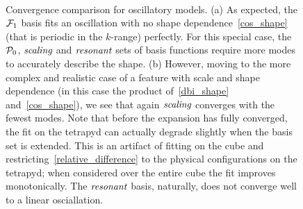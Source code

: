 \begin{figure}[!pth]
\centering     %
\\
\caption{
    Convergence comparison for oscillatory models. (a) As expected, the $\mathcal{F}_1$ basis fits an oscillation with
    no shape dependence~\eqref{cos_shape} (that is periodic in the $k$-range) perfectly.
    For this special case, the $\mathcal{P}_0$, $\textit{scaling}$ and $\textit{resonant}$ sets of basis functions require more modes
    to accurately describe the shape. (b) However, moving to the more complex and realistic case of a
    feature with scale and shape dependence (in this case the product of~\eqref{dbi_shape}
    and~\eqref{cos_shape}), we see that again $\textit{scaling}$ converges with the fewest modes.
    Note that before the expansion has fully converged, the fit on the tetrapyd
    can actually degrade slightly when the basis set is extended. This is an artifact
    of fitting on the cube and restricting~\eqref{relative_difference}
    to the physical configurations on the tetrapyd; when considered over the
    entire cube the fit improves monotonically.
    The $\textit{resonant}$ basis, naturally, does not converge well to a linear osciallation.
}\label{fig:recon_osc_dbiosc}
\end{figure}
